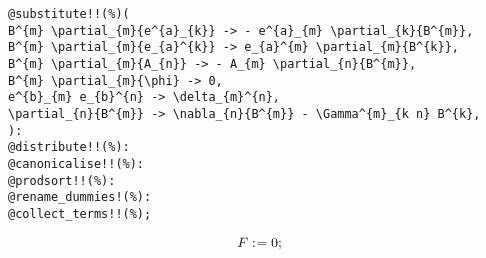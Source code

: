 \documentclass[11pt]{article}
\def\specialcolon{\mathrel{\mathop{:}}\hspace{-.5em}}
\begin{document}
{\color[named]{Blue}\begin{verbatim}
@substitute!!(%)(
B^{m} \partial_{m}{e^{a}_{k}} -> - e^{a}_{m} \partial_{k}{B^{m}},
B^{m} \partial_{m}{e_{a}^{k}} -> e_{a}^{m} \partial_{m}{B^{k}},
B^{m} \partial_{m}{A_{n}} -> - A_{m} \partial_{n}{B^{m}},
B^{m} \partial_{m}{\phi} -> 0,
e^{b}_{m} e_{b}^{n} -> \delta_{m}^{n},
\partial_{n}{B^{m}} -> \nabla_{n}{B^{m}} - \Gamma^{m}_{k n} B^{k},
):
@distribute!!(%):
@canonicalise!!(%):
@prodsort!!(%):
@rename_dummies!(%):
@collect_terms!!(%);
\end{verbatim}}
\begin{dmath*}[compact, spread=2pt]
F\specialcolon{}= 0;
\end{dmath*}
\end{document}
